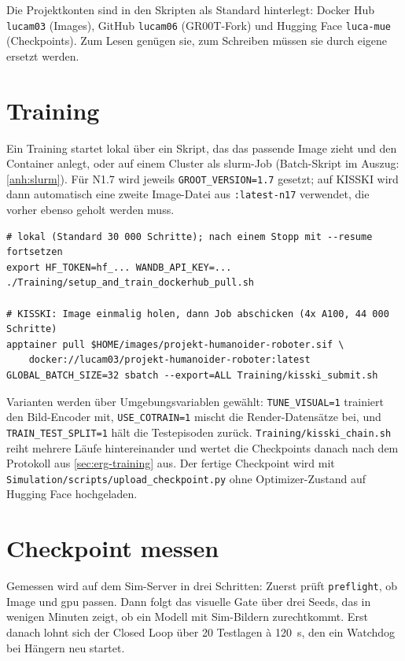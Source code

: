 Die Projektkonten sind in den Skripten als Standard hinterlegt: Docker Hub \texttt{lucam03}
(Images), GitHub \texttt{lucam06} (GR00T-Fork) und Hugging Face \texttt{luca-mue}
(Checkpoints). Zum Lesen genügen sie, zum Schreiben müssen sie durch eigene ersetzt werden.

\clearpage

\section{Training}
\label{sec:anl-training}

Ein Training startet lokal über ein Skript, das das passende Image zieht und den Container
anlegt, oder auf einem Cluster als \acs{slurm}-Job (Batch-Skript im Auszug: \cref{anh:slurm}).
Für N1.7 wird jeweils \texttt{GROOT\_VERSION=1.7} gesetzt; auf KISSKI wird dann automatisch eine
zweite Image-Datei aus \texttt{:latest-n17} verwendet, die vorher ebenso geholt werden muss.

\begin{verbatim}
# lokal (Standard 30 000 Schritte); nach einem Stopp mit --resume fortsetzen
export HF_TOKEN=hf_... WANDB_API_KEY=...
./Training/setup_and_train_dockerhub_pull.sh

# KISSKI: Image einmalig holen, dann Job abschicken (4x A100, 44 000 Schritte)
apptainer pull $HOME/images/projekt-humanoider-roboter.sif \
    docker://lucam03/projekt-humanoider-roboter:latest
GLOBAL_BATCH_SIZE=32 sbatch --export=ALL Training/kisski_submit.sh
\end{verbatim}

Varianten werden über Umgebungsvariablen gewählt: \texttt{TUNE\_VISUAL=1} trainiert den
Bild-Encoder mit, \texttt{USE\_COTRAIN=1} mischt die Render-Datensätze bei, und
\texttt{TRAIN\_TEST\_SPLIT=1} hält die Testepisoden zurück. \texttt{Training/kisski\_chain.sh}
reiht mehrere Läufe hintereinander und wertet die Checkpoints danach nach dem Protokoll aus
\cref{sec:erg-training} aus. Der fertige Checkpoint wird mit
\texttt{Simulation/scripts/upload\_checkpoint.py} ohne Optimizer-Zustand auf Hugging Face
hochgeladen.

\section{Checkpoint messen}
\label{sec:anl-messen}

Gemessen wird auf dem Sim-Server in drei Schritten: Zuerst prüft \texttt{preflight}, ob Image
und \acs{gpu} passen. Dann folgt das visuelle Gate über drei Seeds, das in wenigen Minuten
zeigt, ob ein Modell mit Sim-Bildern zurechtkommt. Erst danach lohnt sich der Closed Loop über
20 Testlagen à 120~s, den ein Watchdog bei Hängern neu startet.

